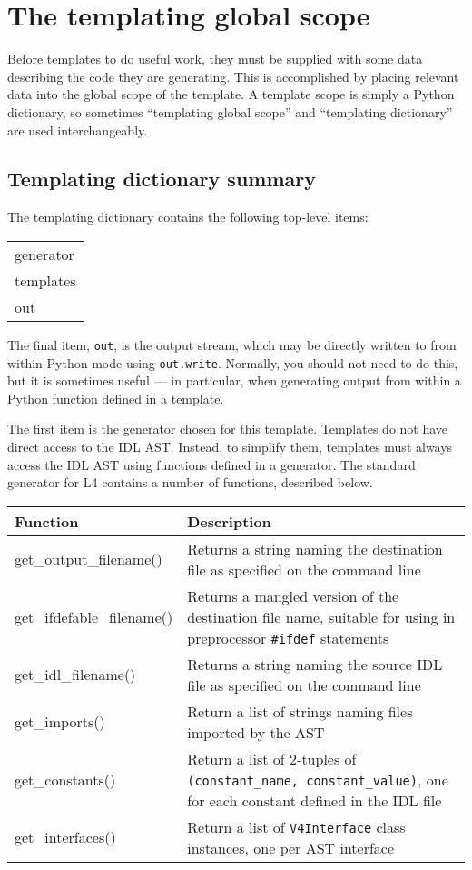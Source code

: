 \section{The templating global scope}
\label{templating.default.scope}
Before templates to do useful work, they must be supplied with some data describing the code they are generating. This is accomplished by placing relevant data into the global scope of the template. A template scope is simply a Python dictionary, so sometimes ``templating global scope'' and ``templating dictionary'' are used interchangeably.

\subsection{Templating dictionary summary}
The templating dictionary contains the following top-level items:

\begin{tabularx}{\textwidth}{l}
generator\\
templates\\
out\\
\end{tabularx}

The final item, \texttt{out}, is the output stream, which may be directly written to from within Python mode using \texttt{out.write}. Normally, you should not need to do this, but it is sometimes useful --- in particular, when generating output from within a Python function defined in a template.

The first item is the generator chosen for this template. Templates do not have direct access to the IDL AST. Instead, to simplify them, templates must always access the IDL AST using functions defined in a generator. The standard generator for L4 contains a number of functions, described below.

\begin{tabularx}{\textwidth}{lX}
\textbf{Function}&\textbf{Description}\\
\hline
get\_output\_filename()&Returns a string naming the destination file as specified on the command line\\
get\_ifdefable\_filename()&Returns a mangled version of the destination file name, suitable for using in preprocessor {\tt \#ifdef} statements\\
get\_idl\_filename()&Returns a string naming the source IDL file as specified on the command line\\
get\_imports()&Return a list of strings naming files imported by the AST\\
get\_constants()&Return a list of 2-tuples of {\tt(constant\_name, constant\_value)}, one for each constant defined in the IDL file\\
get\_interfaces()&Return a list of {\tt V4Interface} class instances, one per AST interface
\end{tabularx}

